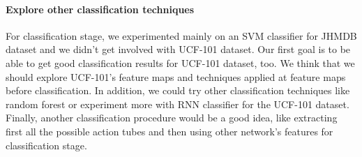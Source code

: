 \paragraph{Explore other  classification techniques}
For classification stage, we experimented mainly on an SVM classifier for JHMDB dataset and we didn't get involved with UCF-101 dataset. Our first
goal is to be able to get good classification results for UCF-101 dataset, too.  We think that we should explore UCF-101's feature maps and techniques applied at feature maps before  classification. In addition, we could try other classification techniques like random forest or experiment more with RNN classifier for the UCF-101 dataset.
Finally, another classification procedure would be a good idea, like extracting first all the possible action tubes and then using other network's features for classification
stage.

% 
